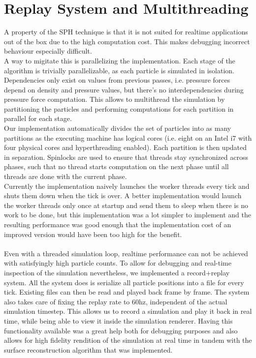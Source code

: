 \documentclass{ACGSeminar}
\begin{document}
\section{Replay System and Multithreading}
A property of the SPH technique is that it is not suited for realtime applications out of the box due to the high computation cost. This makes debugging incorrect behaviour especially difficult. \\
A way to migitate this is parallelizing the implementation. Each stage of the algorithm is trivially parallelizable, as each particle is simulated in isolation. Dependencies only exist on values from previous passes, i.e. pressure forces depend on density and pressure values, but there's no interdependencies during pressure force computation.
This allows to multithread the simulation by partitioning the particles and performing computations for each partition in parallel for each stage.\\
Our implementation automatically divides the set of particles into as many partitions as the executing machine has logical cores (i.e. eight on an Intel i7 with four physical cores and hyperthreading enabled).
Each partition is then updated in separation. Spinlocks are used to ensure that threads stay synchronized across phases, such that no thread starts computation on the next phase until all threads are done with the current phase.\\
Currently the implementation naively launches the worker threads every tick and shuts them down when the tick is over. A better implementation would launch the worker threads only once at startup and send them to sleep when there is no work to be done, but this implementation was a lot simpler to implement and the resulting performance was good enough that the implementation cost of an improved version would have been too high for the benefit.\\
\\
Even with a threaded simulation loop, realtime performance can not be achieved with satisfyingly high particle counts. To allow for debugging and real-time inspection of the simulation nevertheless, we implemented a record+replay system. All the system does is serialize all particle positions into a file for every tick. Existing files can then be read and played back frame by frame. The system also takes care of fixing the replay rate to 60hz, independent of the actual simulation timestep. 
This allows us to record a simulation and play it back in real time, while being able to view it inside the simulation renderer. Having this functionality available was a great help both for debugging purposes and also allows for high fidelity rendition of the simulation at real time in tandem with the surface reconstruction algorithm that was implemented.\\
\\
\end{document}
